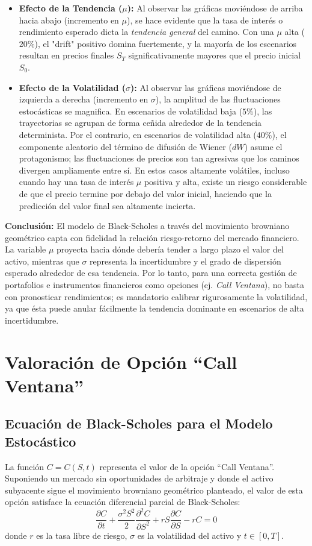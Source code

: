 \documentclass[12pt]{article}
\begin{document}
\begin{itemize}
    \item \textbf{Efecto de la Tendencia ($\mu$):} Al observar las gráficas moviéndose de arriba hacia abajo (incremento en $\mu$), se hace evidente que la tasa de interés o rendimiento esperado dicta la \textit{tendencia general} del camino. Con una $\mu$ alta ($20\%$), el "drift" positivo domina fuertemente, y la mayoría de los escenarios resultan en precios finales $S_T$ significativamente mayores que el precio inicial $S_0$. 
    \item \textbf{Efecto de la Volatilidad ($\sigma$):} Al observar las gráficas moviéndose de izquierda a derecha (incremento en $\sigma$), la amplitud de las fluctuaciones estocásticas se magnifica. En escenarios de volatilidad baja ($5\%$), las trayectorias se agrupan de forma ceñida alrededor de la tendencia determinista. Por el contrario, en escenarios de volatilidad alta ($40\%$), el componente aleatorio del término de difusión de Wiener ($dW$) asume el protagonismo; las fluctuaciones de precios son tan agresivas que los caminos divergen ampliamente entre sí. En estos casos altamente volátiles, incluso cuando hay una tasa de interés $\mu$ positiva y alta, existe un riesgo considerable de que el precio termine por debajo del valor inicial, haciendo que la predicción del valor final sea altamente incierta.
\end{itemize}

\textbf{Conclusión:} El modelo de Black-Scholes a través del movimiento browniano geométrico capta con fidelidad la relación riesgo-retorno del mercado financiero. La variable $\mu$ proyecta hacia dónde debería tender a largo plazo el valor del activo, mientras que $\sigma$ representa la incertidumbre y el grado de dispersión esperado alrededor de esa tendencia. Por lo tanto, para una correcta gestión de portafolios e instrumentos financieros como opciones (ej. \textit{Call Ventana}), no basta con pronosticar rendimientos; es mandatorio calibrar rigurosamente la volatilidad, ya que ésta puede anular fácilmente la tendencia dominante en escenarios de alta incertidumbre.

\section{Valoración de Opción ``Call Ventana''}

\subsection{Ecuación de Black-Scholes para el Modelo Estocástico}
La función $C = C(S,t)$ representa el valor de la opción ``Call Ventana''. Suponiendo un mercado sin oportunidades de arbitraje y donde el activo subyacente sigue el movimiento browniano geométrico planteado, el valor de esta opción satisface la ecuación diferencial parcial de Black-Scholes:
\begin{equation}
\frac{\partial C}{\partial t} + \frac{\sigma^2 S^2}{2} \frac{\partial^2 C}{\partial S^2} + r S \frac{\partial C}{\partial S} - r C = 0
\end{equation}
donde $r$ es la tasa libre de riesgo, $\sigma$ es la volatilidad del activo y $t \in [0, T]$.
\end{document}
